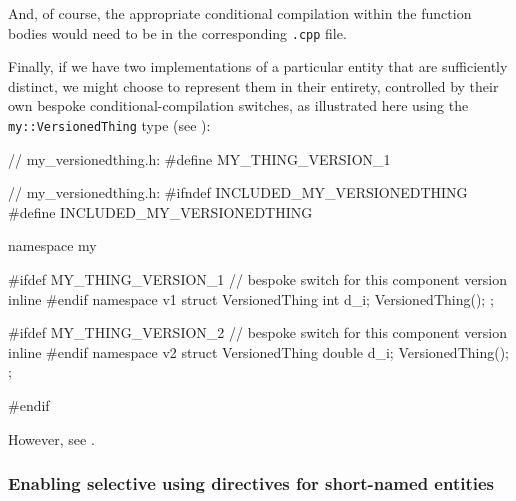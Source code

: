 \noindent And, of course, the appropriate conditional compilation within the
function bodies would need to be in the corresponding \lstinline!.cpp!
file.

Finally, if we have two implementations of a particular entity that are
sufficiently distinct, we might choose to represent them in their
entirety, controlled by their own bespoke conditional-compilation
switches, as illustrated here using the \lstinline!my::VersionedThing! type
(see ):

\begin{emcppshiddenlisting}[emcppsbatch=e7]
// my_versionedthing.h:
#define MY_THING_VERSION_1
\end{emcppshiddenlisting}
\begin{emcppslisting}[emcppsbatch=e7]
// my_versionedthing.h:
#ifndef INCLUDED_MY_VERSIONEDTHING
#define INCLUDED_MY_VERSIONEDTHING

namespace my
{
#ifdef MY_THING_VERSION_1  // bespoke switch for this component version
    inline
#endif
    namespace v1
    {
        struct VersionedThing
        {
            int d_i;
            VersionedThing();
        };
    }

#ifdef MY_THING_VERSION_2  // bespoke switch for this component version
    inline
#endif
    namespace v2
    {
        struct VersionedThing
        {
            double d_i;
            VersionedThing();
        };
    }
}
#endif
\end{emcppslisting}

\noindent However, see .

\subsubsection[Enabling selective \lstinline!using! directives for short-named entities]{Enabling selective {\SubsubsecCode using} directives for short-named entities}\label{enabling-selective-using-directives-for-short-named-entities}

